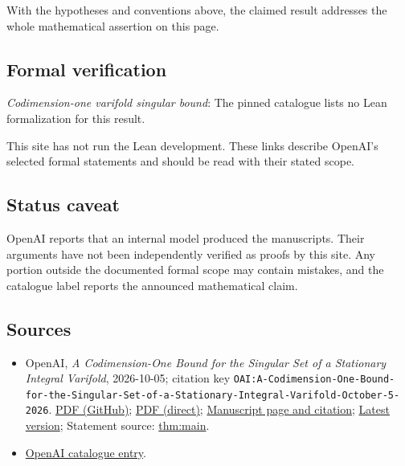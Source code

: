 \documentclass[11pt]{article}
\begin{document}
With the hypotheses and conventions above, the claimed result addresses the whole mathematical assertion on this page.

\subsection{Formal verification}
\textit{Codimension-one varifold singular bound}: The pinned catalogue lists no Lean formalization for this result.

This site has not run the Lean development. These links describe OpenAI’s selected formal statements and should be read with their stated scope.

\subsection{Status caveat}
OpenAI reports that an internal model produced the manuscripts. Their arguments have not been independently verified as proofs by this site. Any portion outside the documented formal scope may contain mistakes, and the catalogue label reports the announced mathematical claim.

\subsection{Sources}
\begin{itemize}
\item OpenAI, \emph{A Codimension-One Bound for the Singular Set of a Stationary Integral Varifold}, 2026-10-05; citation key \texttt{OAI:A-Codimension-One-Bound-for-the-Singular-Set-of-a-Stationary-Integral-Varifold-October-5-2026}. \href{https://github.com/openai/math/blob/adc7f1241b42e322a6451854ab7e4b4c146bf78a/preprints/A-Codimension-One-Bound-for-the-Singular-Set-of-a-Stationary-Integral-Varifold-October-5-2026/varifold-singular-dimension.pdf}{PDF (GitHub)}; \href{https://github.com/openai/math/raw/adc7f1241b42e322a6451854ab7e4b4c146bf78a/preprints/A-Codimension-One-Bound-for-the-Singular-Set-of-a-Stationary-Integral-Varifold-October-5-2026/varifold-singular-dimension.pdf}{PDF (direct)}; \href{https://github.com/openai/math/blob/adc7f1241b42e322a6451854ab7e4b4c146bf78a/preprints/A-Codimension-One-Bound-for-the-Singular-Set-of-a-Stationary-Integral-Varifold-October-5-2026/README.md}{Manuscript page and citation}; \href{https://github.com/openai/math/blob/main/preprints/A-Codimension-One-Bound-for-the-Singular-Set-of-a-Stationary-Integral-Varifold-October-5-2026/varifold-singular-dimension.pdf}{Latest version}; Statement source: \href{https://github.com/openai/math/blob/adc7f1241b42e322a6451854ab7e4b4c146bf78a/preprints/A-Codimension-One-Bound-for-the-Singular-Set-of-a-Stationary-Integral-Varifold-October-5-2026/build/sections/01-introduction.tex\#L32}{thm:main}.
\item \href{https://github.com/openai/math/blob/adc7f1241b42e322a6451854ab7e4b4c146bf78a/CONTENTS.md}{OpenAI catalogue entry}.
\end{itemize}
\end{document}
